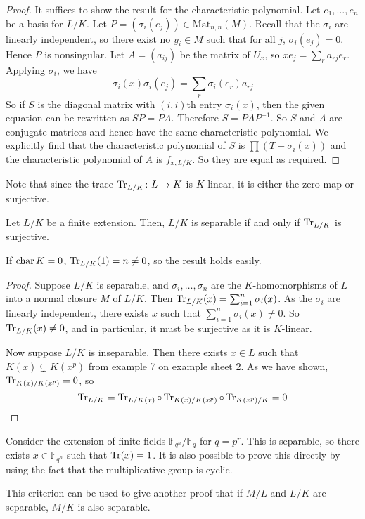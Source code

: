\begin{proof}
	It suffices to show the result for the characteristic polynomial.
	Let \( e_1, \dots, e_n \) be a basis for \( L / K \).
	Let \( P = (\sigma_i(e_j)) \in \mathrm{Mat}_{n,n}(M) \).
	Recall that the \( \sigma_i \) are linearly independent, so there exist no \( y_i \in M \) such that for all \( j \), \( \sigma_i(e_j) = 0 \).
	Hence \( P \) is nonsingular.
	Let \( A = (a_{ij}) \) be the matrix of \( U_x \), so \( xe_j = \sum_r a_{rj} e_r \).
	Applying \( \sigma_i \), we have
	\[ \sigma_i(x) \sigma_i(e_j) = \sum_r \sigma_i(e_r) a_{rj} \]
	So if \( S \) is the diagonal matrix with \( (i,i) \)th entry \( \sigma_i(x) \), then the given equation can be rewritten as \( SP = PA \).
	Therefore \( S = PAP^{-1} \).
	So \( S \) and \( A \) are conjugate matrices and hence have the same characteristic polynomial.
	We explicitly find that the characteristic polynomial of \( S \) is \( \prod(T - \sigma_i(x)) \) and the characteristic polynomial of \( A \) is \( f_{x,L/K} \).
	So they are equal as required.
\end{proof}
Note that since the trace \( \Tr_{L/K} \colon L \to K \) is \( K \)-linear, it is either the zero map or surjective.
\begin{theorem}
	Let \( L / K \) be a finite extension.
	Then, \( L / K \) is separable if and only if \( \Tr_{L/K} \) is surjective.
\end{theorem}
\begin{remark}
	If \( \operatorname{char} K = 0 \), \( \Tr_{L/K}(1) = n \neq 0 \), so the result holds easily.
\end{remark}
\begin{proof}
	Suppose \( L / K \) is separable, and \( \sigma_i, \dots, \sigma_n \) are the \( K \)-homomorphisms of \( L \) into a normal closure \( M \) of \( L / K \).
	Then \( \Tr_{L/K}(x) = \sum_{i=1}^n \sigma_i(x) \).
	As the \( \sigma_i \) are linearly independent, there exists \( x \) such that \( \sum_{i=1}^n \sigma_i(x) \neq 0 \).
	So \( \Tr_{L/K}(x) \neq 0 \), and in particular, it must be surjective as it is \( K \)-linear.

	Now suppose \( L / K \) is inseparable.
	Then there exists \( x \in L \) such that \( K(x) \subsetneq K(x^p) \) from example 7 on example sheet 2.
	As we have shown, \( \Tr_{K(x)/K(x^p)} = 0 \), so
	\[ \Tr_{L/K} = \Tr_{L/K(x)} \circ \Tr_{K(x)/K(x^p)} \circ \Tr_{K(x^p)/K} = 0 \]
\end{proof}
\begin{example}
	Consider the extension of finite fields \( \mathbb F_{q^n} / \mathbb F_q \) for \( q = p^r \).
	This is separable, so there exists \( x \in \mathbb F_{q^n} \) such that \( \Tr(x) = 1 \).
	It is also possible to prove this directly by using the fact that the multiplicative group is cyclic.
\end{example}
\begin{remark}
	This criterion can be used to give another proof that if \( M / L \) and \( L / K \) are separable, \( M / K \) is also separable.
\end{remark}
